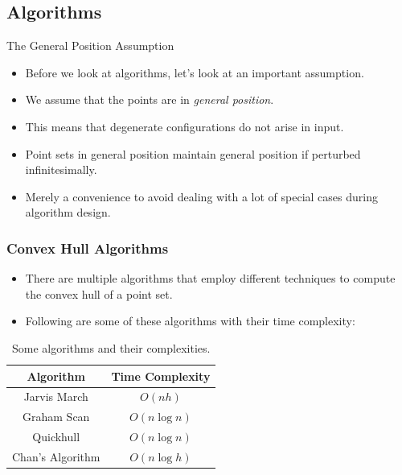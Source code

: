 \documentclass{beamer}
\begin{document}
    \subsection{Algorithms}
    \begin{frame}{The General Position Assumption}
        \begin{itemize}
            \item Before we look at algorithms, let's look at an important 
            assumption. 
            \item We assume that the points are in \emph{general position}.
            \item This means that degenerate configurations do not arise in input. 
            \item Point sets in general position maintain general position if perturbed infinitesimally.
            \item Merely a convenience to avoid dealing with a lot of special cases during algorithm design.
        \end{itemize}
    \end{frame}

    \begin{frame}
      \frametitle[t]{Convex Hull Algorithms}
      \begin{itemize}
        \item There are multiple algorithms that employ different techniques to compute 
        the convex hull of a point set. 
        \item Following are some of these algorithms with their time complexity:
      \end{itemize}
        \begin{table}[h!]
            \centering
            \begin{tabular}{|c|c|}
                \hline 
                \textbf{Algorithm} & \textbf{Time Complexity}  \\ \hline 
                Jarvis March  & $O(nh)$ \\ \hline 
                Graham Scan & $O(n \log n)$ \\ \hline
                Quickhull & $O(n \log n)$ \\ \hline 
                Chan's Algorithm & $O(n \log h)$ \\ \hline 
            \end{tabular}
            \caption{Some algorithms and their complexities.}
            \label{tab:my_label}
        \end{table}
    \end{frame}
    
\end{document}
